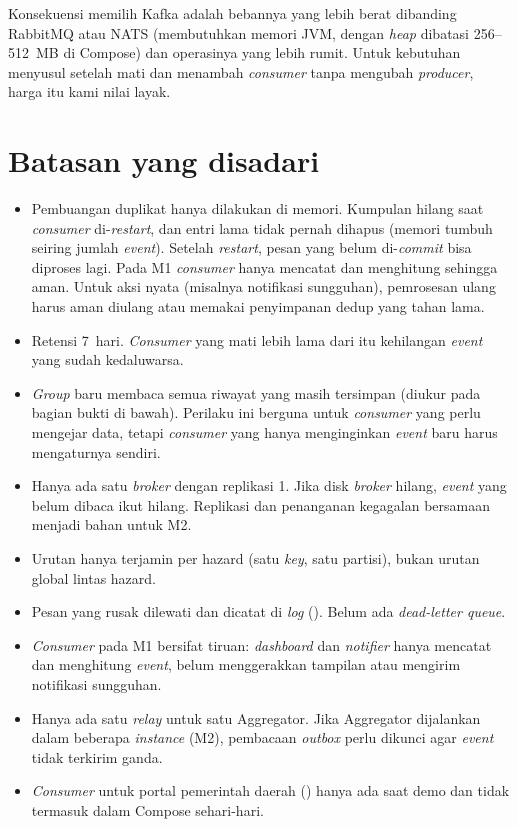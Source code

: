Konsekuensi memilih Kafka adalah bebannya yang lebih berat dibanding RabbitMQ atau NATS (membutuhkan memori JVM, dengan
\emph{heap} dibatasi 256--512~MB di Compose) dan operasinya yang lebih rumit. Untuk kebutuhan menyusul setelah mati dan
menambah \emph{consumer} tanpa mengubah \emph{producer}, harga itu kami nilai layak.

\section{Batasan yang disadari}

\begin{itemize}
 \item Pembuangan duplikat hanya dilakukan di memori. Kumpulan  hilang saat \emph{consumer} di-\emph{restart}, dan entri lama tidak pernah dihapus (memori tumbuh seiring jumlah \emph{event}). Setelah \emph{restart}, pesan yang belum di-\emph{commit} bisa diproses lagi. Pada M1 \emph{consumer} hanya mencatat dan menghitung sehingga aman. Untuk aksi nyata (misalnya notifikasi sungguhan), pemrosesan ulang harus aman diulang atau memakai penyimpanan dedup yang tahan lama.
 \item Retensi 7~hari. \emph{Consumer} yang mati lebih lama dari itu kehilangan \emph{event} yang sudah kedaluwarsa.
 \item \emph{Group} baru membaca semua riwayat yang masih tersimpan (diukur pada bagian bukti di bawah). Perilaku ini berguna untuk \emph{consumer} yang perlu mengejar data, tetapi \emph{consumer} yang hanya menginginkan \emph{event} baru harus mengaturnya sendiri.
 \item Hanya ada satu \emph{broker} dengan replikasi 1. Jika disk \emph{broker} hilang, \emph{event} yang belum dibaca ikut hilang. Replikasi dan penanganan kegagalan bersamaan menjadi bahan untuk M2.
 \item Urutan hanya terjamin per hazard (satu \emph{key}, satu partisi), bukan urutan global lintas hazard.
 \item Pesan yang rusak dilewati dan dicatat di \emph{log} (). Belum ada \emph{dead-letter queue}.
 \item \emph{Consumer} pada M1 bersifat tiruan: \emph{dashboard} dan \emph{notifier} hanya mencatat dan menghitung \emph{event}, belum menggerakkan tampilan atau mengirim notifikasi sungguhan.
 \item Hanya ada satu \emph{relay} untuk satu Aggregator. Jika Aggregator dijalankan dalam beberapa \emph{instance} (M2), pembacaan \emph{outbox} perlu dikunci agar \emph{event} tidak terkirim ganda.
 \item \emph{Consumer} untuk portal pemerintah daerah () hanya ada saat demo dan tidak termasuk dalam Compose sehari-hari.
\end{itemize}

